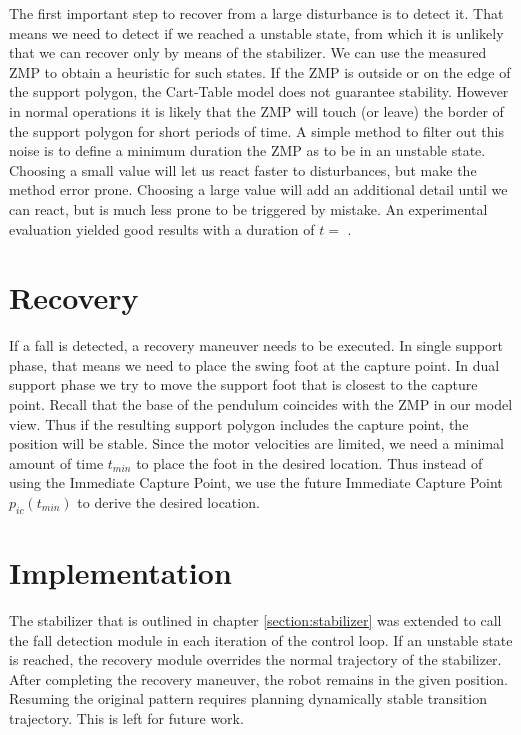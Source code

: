 \documentclass[english,ngerman]{KITreprt}
\newcommand{\fixme}[1]{{\color{red}{FIXME: #1}}}
\begin{document}
The first important step to recover from a large disturbance is to
detect it. That means we need to detect if we reached a unstable state,
from which it is unlikely that we can recover only by means of the
stabilizer. We can use the measured ZMP to obtain a heuristic for such
states. If the ZMP is outside or on the edge of the support polygon, the
Cart-Table model does not guarantee stability. However in normal
operations it is likely that the ZMP will touch (or leave) the border of
the support polygon for short periods of time. A simple method to filter
out this noise is to define a minimum duration the ZMP as to be in an
unstable state. Choosing a small value will let us react faster to
disturbances, but make the method error prone. Choosing a large value
will add an additional detail until we can react, but is much less prone
to be triggered by mistake. An experimental evaluation yielded good
results with a duration of $t = $ \fixme{add real time here}.

\section{Recovery}\label{recovery}

If a fall is detected, a recovery maneuver needs to be executed. In
single support phase, that means we need to place the swing foot at the
capture point. In dual support phase we try to move the support foot
that is closest to the capture point. Recall that the base of the
pendulum coincides with the ZMP in our model view. Thus if the resulting
support polygon includes the capture point, the position will be stable.
Since the motor velocities are limited, we need a minimal amount of time
$t_{min}$ to place the foot in the desired location. Thus instead of
using the Immediate Capture Point, we use the future Immediate Capture
Point $p_{ic}(t_{min})$ to derive the desired location.

\section{Implementation}\label{implementation-2}

The stabilizer that is outlined in chapter \ref{section:stabilizer} was
extended to call the fall detection module in each iteration of the
control loop. If an unstable state is reached, the recovery module
overrides the normal trajectory of the stabilizer. After completing the
recovery maneuver, the robot remains in the given position. Resuming the
original pattern requires planning dynamically stable transition
trajectory. This is left for future work.
\end{document}

